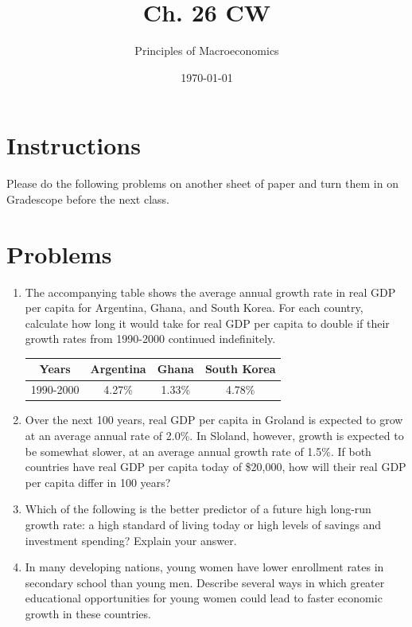 \documentclass{article}
\title{Ch. 26 CW}
\author{Principles of Macroeconomics}
\date{\today}
\begin{document}
\maketitle

\section*{Instructions}

Please do the following problems on another sheet of paper and turn them in on Gradescope before the next class.

\section*{Problems}

\begin{enumerate}

\item The accompanying table shows the average annual growth rate in real GDP per capita for Argentina, Ghana, and South Korea.  For each country, calculate how long it would take for real GDP per capita to double if their growth rates from 1990-2000 continued indefinitely.

	\begin{center}
	\begin{tabular}{| c | c | c | c |}
	\hline
	Years & Argentina & Ghana & South Korea \\
	\hline
	1990-2000 & 4.27\% & 1.33\% & 4.78\% \\
	\hline
	\end{tabular}
	\end{center}
	
\item Over the next 100 years, real GDP per capita in Groland is expected to grow at an average annual rate of 2.0\%. In Sloland, however, growth is expected to be somewhat slower, at an average annual growth rate of 1.5\%. If both countries have real GDP per capita today of \$20,000, how will their real GDP per capita differ in 100 years?

\item Which of the following is the better predictor of a future high long-run growth rate: a high standard of living today or high levels of savings and investment spending? Explain your answer. 

\item In many developing nations, young women have lower enrollment rates in secondary school than young men. Describe several ways in which greater educational opportunities for young women could lead to faster economic growth in these countries.


\end{enumerate}
\end{document}
